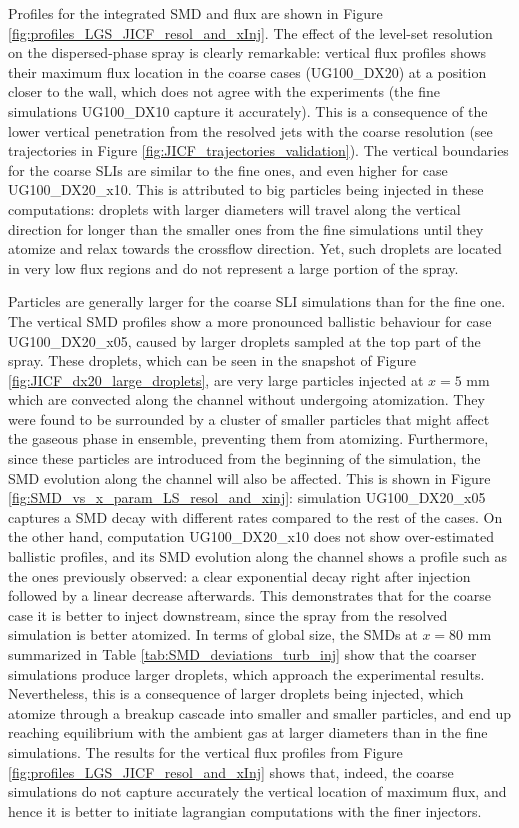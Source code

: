 Profiles for the integrated SMD and flux are shown in Figure \ref{fig:profiles_LGS_JICF_resol_and_xInj}. The effect of the level-set resolution on the dispersed-phase spray is clearly remarkable: vertical flux profiles shows their maximum flux location in the coarse cases (UG100\_DX20) at a position closer to the wall, which does not agree with the experiments (the fine simulations UG100\_DX10 capture it accurately). This is a consequence of the lower vertical penetration from the resolved jets with the coarse resolution (see trajectories in Figure \ref{fig:JICF_trajectories_validation}). The vertical boundaries for the coarse SLIs are similar to the fine ones, and even higher for case UG100\_DX20\_x10. This is attributed to big particles being injected in these computations: droplets with larger diameters will travel along the vertical direction for longer than the smaller ones from the fine simulations until they atomize and relax towards the crossflow direction. Yet, such droplets are located in very low flux regions and do not represent a large portion of the spray. 

Particles are generally larger for the coarse SLI simulations than for the fine one. The vertical SMD profiles show a more pronounced ballistic behaviour for case UG100\_DX20\_x05, caused by larger droplets sampled at the top part of the spray. These droplets, which can be seen in the snapshot of Figure \ref{fig:JICF_dx20_large_droplets}, are very large particles injected at $x = 5$ mm which are convected along the channel without undergoing atomization. They were found to be surrounded by a cluster of smaller particles that might affect the gaseous phase in ensemble, preventing them from atomizing. Furthermore, since these particles are introduced from the beginning of the simulation, the SMD evolution along the channel will also be affected. This is shown in Figure \ref{fig:SMD_vs_x_param_LS_resol_and_xinj}: simulation UG100\_DX20\_x05 captures a SMD decay with different rates compared to the rest of the cases. On the other hand, computation UG100\_DX20\_x10 does not show over-estimated ballistic profiles, and its SMD evolution along the channel shows a profile such as the ones previously observed: a clear exponential decay right after injection followed by a linear decrease afterwards. This demonstrates that for the coarse case it is better to inject downstream, since the spray from the resolved simulation is better atomized. In terms of global size, the SMDs at $x = 80$ mm summarized in Table \ref{tab:SMD_deviations_turb_inj} show that the coarser simulations produce larger droplets, which approach the experimental results. Nevertheless, this is a consequence of larger droplets being injected, which atomize through a breakup cascade into smaller and smaller particles, and end up reaching equilibrium with the ambient gas at larger diameters than in the fine simulations. The results for the vertical flux profiles from Figure \ref{fig:profiles_LGS_JICF_resol_and_xInj} shows that, indeed, the coarse simulations do not capture accurately the vertical location of maximum flux, and hence it is better to initiate lagrangian computations with the finer injectors.

